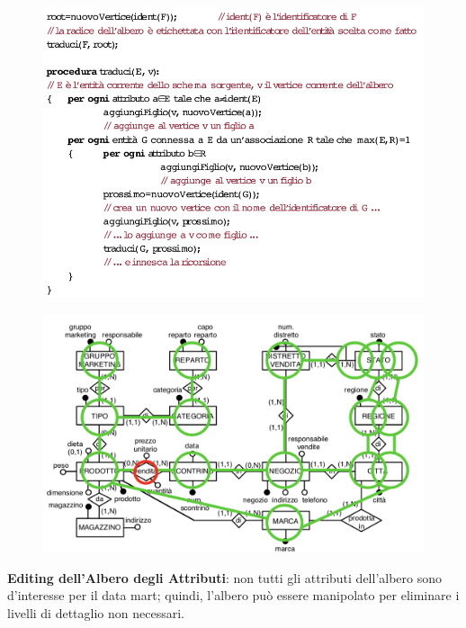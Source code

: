 \documentclass[a4paper, notitlepage, 9pt]{extreport}
\begin{document}
\begin{multicols}{2}
	\begin{figure}[H]
		\centering
		\includegraphics[scale=0.4]{Albero}
	\end{figure}
	\columnbreak
	\begin{figure}[H]
		\centering
		\includegraphics[scale=0.4]{Esempio}
	\end{figure}
\end{multicols}
\noindent
\textbf{Editing dell'Albero degli Attributi}: non tutti gli attributi dell’albero sono d’interesse per il data mart; quindi, l’albero può essere manipolato per eliminare i livelli di dettaglio non necessari.
\end{document}
